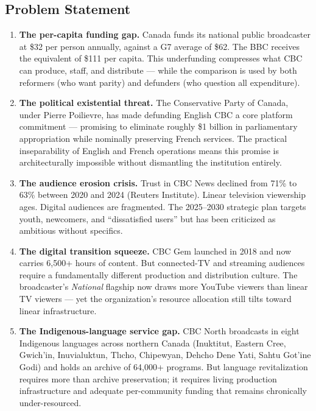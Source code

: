 \documentclass[11pt,letterpaper]{article}
\begin{document}
\subsection{Problem Statement}

\begin{enumerate}[leftmargin=*, label=\textbf{\arabic*.}]
\item \textbf{The per-capita funding gap.} Canada funds its national public broadcaster at \$32 per person annually, against a G7 average of \$62. The BBC receives the equivalent of \$111 per capita. This underfunding compresses what CBC can produce, staff, and distribute --- while the comparison is used by both reformers (who want parity) and defunders (who question all expenditure).

\item \textbf{The political existential threat.} The Conservative Party of Canada, under Pierre Poilievre, has made defunding English CBC a core platform commitment --- promising to eliminate roughly \$1 billion in parliamentary appropriation while nominally preserving French services. The practical inseparability of English and French operations means this promise is architecturally impossible without dismantling the institution entirely.

\item \textbf{The audience erosion crisis.} Trust in CBC News declined from 71\% to 63\% between 2020 and 2024 (Reuters Institute). Linear television viewership ages. Digital audiences are fragmented. The 2025--2030 strategic plan targets youth, newcomers, and ``dissatisfied users'' but has been criticized as ambitious without specifics.

\item \textbf{The digital transition squeeze.} CBC Gem launched in 2018 and now carries 6,500+ hours of content. But connected-TV and streaming audiences require a fundamentally different production and distribution culture. The broadcaster's \emph{National} flagship now draws more YouTube viewers than linear TV viewers --- yet the organization's resource allocation still tilts toward linear infrastructure.

\item \textbf{The Indigenous-language service gap.} CBC North broadcasts in eight Indigenous languages across northern Canada (Inuktitut, Eastern Cree, Gwich'in, Inuvialuktun, Tl\i{}cho, Chipewyan, Dehcho Dene Yati, Sahtu Got'ine Godi) and holds an archive of 64,000+ programs. But language revitalization requires more than archive preservation; it requires living production infrastructure and adequate per-community funding that remains chronically under-resourced.
\end{enumerate}
\end{document}
